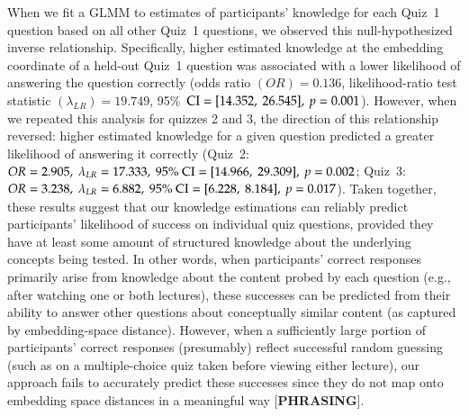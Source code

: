 \documentclass[10pt]{article}
\begin{document}
When we fit a GLMM to estimates of participants' knowledge for each Quiz~1 question based on all other Quiz~1 questions, we observed this null-hypothesized inverse relationship. 
Specifically, higher estimated knowledge at the embedding coordinate of a held-out Quiz~1 question was associated with a lower likelihood of answering the question correctly (odds ratio $(OR) = 0.136$, likelihood-ratio test statistic $(\lambda_{LR}) = 19.749$, 95\%\ $\textnormal{CI} = [14.352,\ 26.545],\ p = 0.001$). 
However, when we repeated this analysis for quizzes 2 and 3, the direction of this relationship reversed: higher estimated knowledge for a given question predicted a greater likelihood of answering it correctly (Quiz~2: $OR = 2.905,\ \lambda_{LR} = 17.333,\ 95\%\ \textnormal{CI} = [14.966,\ 29.309],\ p = 0.002$; Quiz~3: $OR = 3.238,\ \lambda_{LR} = 6.882,\ 95\%\ \textnormal{CI} = [6.228,\ 8.184],\ p = 0.017$). 
Taken together, these results suggest that our knowledge estimations can reliably predict participants' likelihood of success on individual quiz questions, provided they have at least some amount of structured knowledge about the underlying concepts being tested. 
In other words, when participants' correct responses primarily arise from knowledge about the content probed by each question (e.g., after watching one or both lectures), these successes can be predicted from their ability to answer other questions about conceptually similar content (as captured by embedding-space distance).
However, when a sufficiently large portion of participants' correct responses (presumably) reflect successful random guessing (such as on a multiple-choice quiz taken before viewing either lecture), our approach fails to accurately predict these successes since they do not map onto embedding space distances in a meaningful way [\textbf{PHRASING}].
\end{document}
